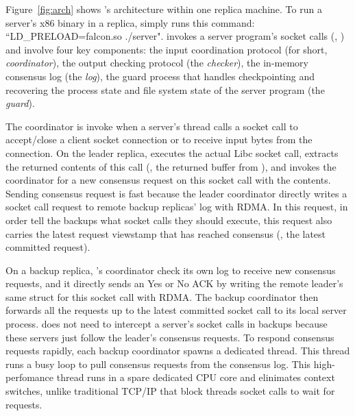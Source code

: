 Figure~\ref{fig:arch} shows \xxx's architecture within one replica machine. To 
run a server's x86 binary in a replica, \xxx simply runs this command: 
``LD\_PRELOAD=falcon.so ./server". \xxx invokes a server program's socket calls 
(\eg, \recv) and involve four key components: the input coordination 
protocol (for short, \emph{coordinator}), the output checking protocol (the 
\emph{checker}), the in-memory consensus log (the \emph{log}), the guard process 
that handles checkpointing and recovering the process state and file system 
state of the server program (the \emph{guard}).



The coordinator is invoke when a server's thread calls a socket call to 
accept/close a client socket connection or to receive input bytes from the 
connection. On the leader replica, \xxx executes the actual Libc socket 
call, extracts the returned contents of this call (\eg, the returned buffer 
from \recv), and invokes the coordinator for a new consensus request on this 
socket call with the contents. Sending consensus request is fast because the 
leader coordinator directly writes a socket call request to remote backup 
replicas' log with RDMA. In this request, in order tell the backups what socket 
calls they should execute, this request also carries the latest request 
viewstamp that has reached consensus (\ie, the latest committed request).


On a backup replica, \xxx's coordinator check its own log to receive new 
consensus requests, and it directly sends an Yes or No ACK by writing the 
remote leader's same struct for this socket call with RDMA. The backup 
coordinator then forwards all the requests up to the latest committed socket 
call to its local server process. \xxx does not need to intercept a 
server's socket calls in backups because these servers just follow the 
leader's consensus requests. To respond consensus requests rapidly, each 
backup coordinator spawns a dedicated thread. This thread runs a busy loop to 
pull consensus requests from the consensus log. This high-perfomance thread 
runs in a spare dedicated CPU core and elinimates context switches, unlike 
traditional TCP/IP that block threads socket calls to wait for requests.

